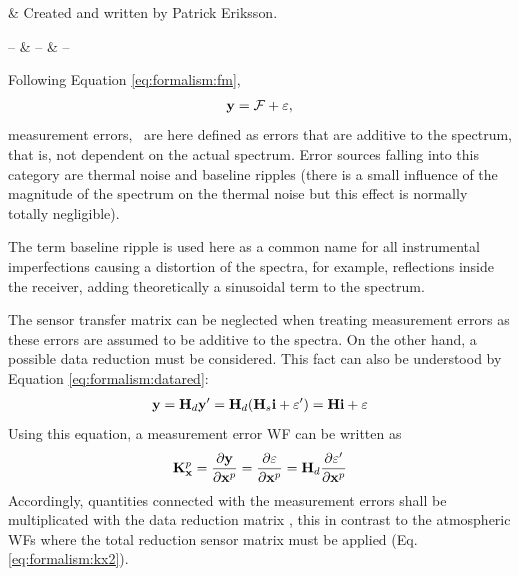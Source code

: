 %
%
 \label{sec:measerr}


%
%
 & Created and written by Patrick Eriksson.\\
\stophistory


%
%
%
\startsymbols
  -- & -- & -- \\
 \label{symtable:measerr}     
\stopsymbols



%
%
Following Equation \ref{eq:formalism:fm},
\begin{eqnarray}
   \mathbf{y} = \mathcal{F} + \varepsilon, \nonumber
\end{eqnarray}
measurement errors, \merr\, are here defined as errors that are
additive to the spectrum, that is, not dependent on the actual spectrum.
Error sources falling into this category are thermal noise and
baseline ripples (there is a small influence of the magnitude of the
spectrum on the thermal noise but this effect is normally totally
negligible).

The term baseline ripple is used here as a common name for all instrumental
imperfections causing a distortion of the spectra, for example,
reflections inside the receiver, adding theoretically a sinusoidal term
to the spectrum.



 \label{sec:measerr:general}
 
 The sensor transfer matrix can be neglected when treating measurement
 errors as these errors are assumed to be additive to the spectra. On
 the other hand, a possible data reduction must be considered. This
 fact can also be understood by Equation \ref{eq:formalism:datared}:
 \begin{eqnarray}
   \mathbf{y} = \mathbf{H}_d \mathbf{y}' = \mathbf{H}_d (\mathbf{H}_s \mathbf{i} + \varepsilon') = \mathbf{H} \mathbf{i} + \varepsilon \nonumber
 \end{eqnarray}
 Using this equation, a measurement error WF can be
 written as
 \begin{equation}
    \mathbf{K}_{\mathbf{x}}^p = \frac{\partial \mathbf{y}}{\partial \mathbf{x}^p} 
               = \frac{\partial \varepsilon}{\partial \mathbf{x}^p}
               =  \mathbf{H}_d \frac{\partial \varepsilon'}{\partial \mathbf{x}^p}
  \label{eq:measerr:kx}
 \end{equation}
 Accordingly, quantities connected with the measurement errors shall be
 multiplicated with the data reduction matrix \Hd, this in contrast to
 the atmospheric WFs where the total reduction sensor matrix must be applied
 (Eq. \ref{eq:formalism:kx2}).



